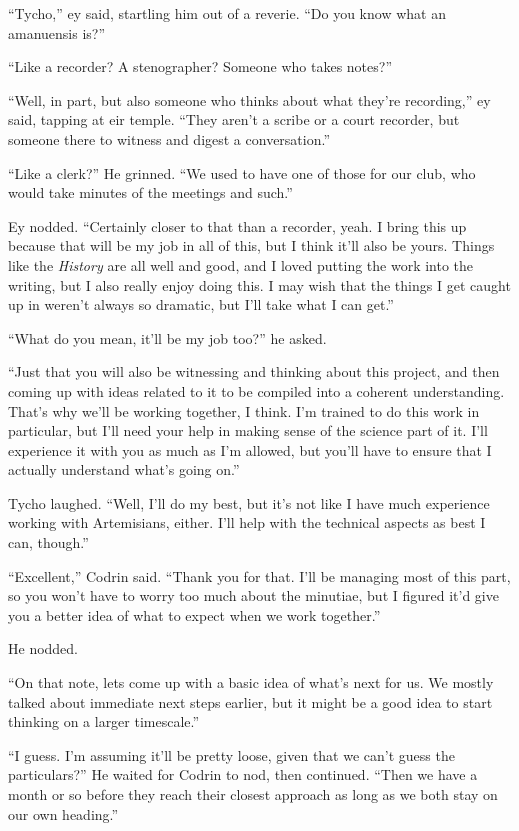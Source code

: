 ``Tycho,'' ey said, startling him out of a reverie. ``Do you know what an amanuensis is?''

``Like a recorder? A stenographer? Someone who takes notes?''

``Well, in part, but also someone who thinks about what they're recording,'' ey said, tapping at eir temple. ``They aren't a scribe or a court recorder, but someone there to witness and digest a conversation.''

``Like a clerk?'' He grinned. ``We used to have one of those for our club, who would take minutes of the meetings and such.''

Ey nodded. ``Certainly closer to that than a recorder, yeah. I bring this up because that will be my job in all of this, but I think it'll also be yours. Things like the \emph{History} are all well and good, and I loved putting the work into the writing, but I also really enjoy doing this. I may wish that the things I get caught up in weren't always so dramatic, but I'll take what I can get.''

``What do you mean, it'll be my job too?'' he asked.

``Just that you will also be witnessing and thinking about this project, and then coming up with ideas related to it to be compiled into a coherent understanding. That's why we'll be working together, I think. I'm trained to do this work in particular, but I'll need your help in making sense of the science part of it. I'll experience it with you as much as I'm allowed, but you'll have to ensure that I actually understand what's going on.''

Tycho laughed. ``Well, I'll do my best, but it's not like I have much experience working with Artemisians, either. I'll help with the technical aspects as best I can, though.''

``Excellent,'' Codrin said. ``Thank you for that. I'll be managing most of this part, so you won't have to worry too much about the minutiae, but I figured it'd give you a better idea of what to expect when we work together.''

He nodded.

``On that note, lets come up with a basic idea of what's next for us. We mostly talked about immediate next steps earlier, but it might be a good idea to start thinking on a larger timescale.''

``I guess. I'm assuming it'll be pretty loose, given that we can't guess the particulars?'' He waited for Codrin to nod, then continued. ``Then we have a month or so before they reach their closest approach as long as we both stay on our own heading.''

